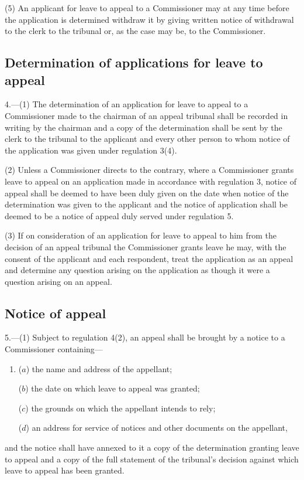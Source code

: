\documentclass[12pt,a4paper]{article}
\begin{document}
(5) An applicant for leave to appeal to a Commissioner may at any time before the application is determined withdraw it by giving written notice of withdrawal to the clerk to the tribunal or, as the case may be, to the Commissioner.


\subsection[4. Determination of applications for leave to appeal]{Determination of applications for leave to appeal}

4.—(1) The determination of an application for leave to appeal to a Commissioner made to the chairman of an appeal tribunal shall be recorded in writing by the chairman and a copy of the determination shall be sent by the clerk to the tribunal to the applicant and every other person to whom notice of the application was given under regulation 3(4).

(2) Unless a Commissioner directs to the contrary, where a Commissioner grants leave to appeal on an application made in accordance with regulation 3, notice of appeal shall be deemed to have been duly given on the date when notice of the determination was given to the applicant and the notice of application shall be deemed to be a notice of appeal duly served under regulation 5.

(3) If on consideration of an application for leave to appeal to him from the decision of an appeal tribunal the Commissioner grants leave he may, with the consent of the applicant and each respondent, treat the application as an appeal and determine any question arising on the application as though it were a question arising on an appeal.

\subsection[5. Notice of appeal]{Notice of appeal}

5.—(1) Subject to regulation 4(2), an appeal shall be brought by a notice to a Commissioner containing—
\begin{enumerate}\item[]
($a$) the name and address of the appellant;

($b$) the date on which leave to appeal was granted;

($c$) the grounds on which the appellant intends to rely;

($d$) an address for service of notices and other documents on the appellant,
\end{enumerate}
and the notice shall have annexed to it a copy of the determination granting leave to appeal and a copy of the 
full statement of the tribunal’s decision  %
against which leave to appeal has been granted.
\end{document}

